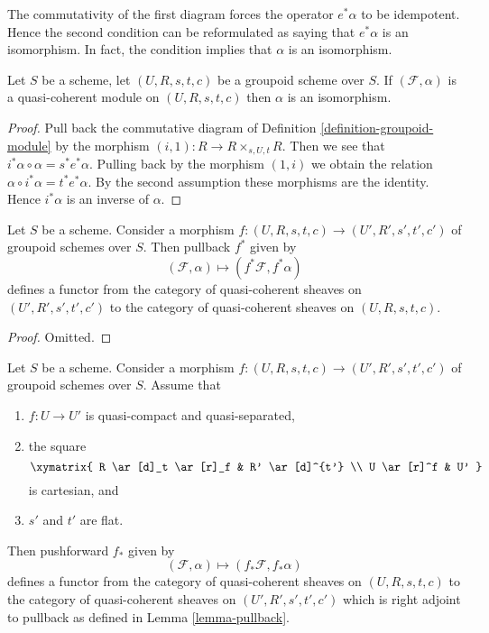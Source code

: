\noindent
The commutativity of the first diagram forces the operator $e^*\alpha$
to be idempotent. Hence the second condition can be reformulated as saying
that $e^*\alpha$ is an isomorphism. In fact, the condition implies that
$\alpha$ is an isomorphism.

\begin{lemma}
\label{lemma-isomorphism}
Let $S$ be a scheme, let $(U, R, s, t, c)$ be a groupoid scheme over $S$.
If $(\mathcal{F}, \alpha)$ is a quasi-coherent module on $(U, R, s, t, c)$
then $\alpha$ is an isomorphism.
\end{lemma}

\begin{proof}
Pull back the commutative diagram of
Definition \ref{definition-groupoid-module}
by the morphism $(i, 1) : R \to R \times_{s, U, t} R$.
Then we see that $i^*\alpha \circ \alpha = s^*e^*\alpha$.
Pulling back by the morphism $(1, i)$ we obtain the relation
$\alpha \circ i^*\alpha = t^*e^*\alpha$. By the second assumption 
these morphisms are the identity. Hence $i^*\alpha$ is an inverse of
$\alpha$.
\end{proof}

\begin{lemma}
\label{lemma-pullback}
Let $S$ be a scheme. Consider a morphism
$f : (U, R, s, t, c) \to (U', R', s', t', c')$
of groupoid schemes over $S$. Then pullback $f^*$ given by
$$
(\mathcal{F}, \alpha) \mapsto (f^*\mathcal{F}, f^*\alpha)
$$
defines a functor from the category of quasi-coherent sheaves on
$(U', R', s', t', c')$ to the category of quasi-coherent sheaves on
$(U, R, s, t, c)$.
\end{lemma}

\begin{proof}
Omitted.
\end{proof}

\begin{lemma}
\label{lemma-pushforward}
Let $S$ be a scheme. Consider a morphism
$f : (U, R, s, t, c) \to (U', R', s', t', c')$
of groupoid schemes over $S$. Assume that
\begin{enumerate}
\item $f : U \to U'$ is quasi-compact and quasi-separated,
\item the square
$$
\xymatrix{
R \ar[d]_t \ar[r]_f & R' \ar[d]^{t'} \\
U \ar[r]^f & U'
}
$$
is cartesian, and
\item $s'$ and $t'$ are flat.
\end{enumerate}
Then pushforward $f_*$ given by
$$
(\mathcal{F}, \alpha) \mapsto (f_*\mathcal{F}, f_*\alpha)
$$
defines a functor from the category of quasi-coherent sheaves on
$(U, R, s, t, c)$ to the category of quasi-coherent sheaves on
$(U', R', s', t', c')$ which is right adjoint to pullback as defined in
Lemma \ref{lemma-pullback}.
\end{lemma}

